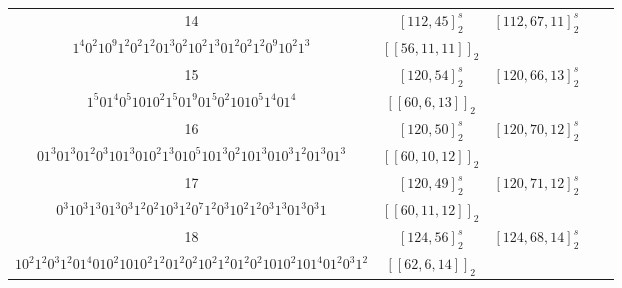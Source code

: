 \documentclass[journal]{IEEEtran}
\begin{document}
\begin{table}[!t]
\begin{tabular}{ccccc}
		14  & $[112, 45]_2^s$ & $[112, 67,11]_2^s$  &                                                                                                                                   \makecell[c]{$1^{2}0^{2}1^6,101010^{3}101^{2}0^{3}1^{4}0101^{2}0^{3}1^{3}0^{3}1^{2}0101^{4}0^{3}1^{2}010^{3}101$,\\$1^{4}0^{2}10^{9}1^{2}0^{2}1^{2}01^{3}0^{2}10^{2}1^{3}01^{2}0^{2}1^{2}0^{9}10^{2}1^3$}                                                                                                                                   & $[[56,11,11]]_2$ \\
		15  & $[120, 54]_2^s$ & $[120, 66,13]_2^s$  &                                                                                                                                         \makecell[c]{$1^{2}0^{2}1,0101010^{3}1^{5}01^{3}01^{2}0^{2}10^{3}1^{2}0^{3}1^{2}0^{3}10^{2}1^{2}01^{3}01^{5}0^{3}10101$,\\$1^{5}01^{4}0^{5}1010^{2}1^{5}01^{9}01^{5}0^{2}1010^{5}1^{4}01^4$}                                                                                                                                          & $[[60,6,13]]_2$  \\
		16  & $[120, 50]_2^s$ & $[120, 70,12]_2^s$  &                                                                                                                         \makecell[c]{$10^{5}101,0^{2}10^{3}10^{2}1^{2}01^{4}010^{4}1^{2}0^{2}1^{2}0^{5}1^{2}0^{2}1^{2}0^{4}101^{4}01^{2}0^{2}10^{3}1$,\\$01^{3}01^{3}01^{2}0^{3}101^{3}010^{2}1^{3}010^{5}101^{3}0^{2}101^{3}010^{3}1^{2}01^{3}01^3$}                                                                                                                         & $[[60,10,12]]_2$ \\
		17  & $[120, 49]_2^s$ & $[120, 71,12]_2^s$  &                                                                                                                           \makecell[c]{$10^{5}101,1^{2}010^{3}1^{4}0^{2}1010^{2}1010^{3}101^{3}0101^{3}010^{3}1010^{2}1010^{2}1^{4}0^{3}101$,\\$0^{3}10^{3}1^{3}01^{3}0^{3}1^{2}0^{2}10^{3}1^{2}0^{7}1^{2}0^{3}10^{2}1^{2}0^{3}1^{3}01^{3}0^{3}1$}                                                                                                                            & $[[60,11,12]]_2$ \\
		18  & $[124, 56]_2^s$ & $[124, 68,14]_2^s$  &                                                                                                                        \makecell[c]{$1^{4}01,1^{2}0^{2}101^{4}0^{7}1^{3}0^{4}10^{2}10^{3}10^{3}10^{2}10^{4}1^{3}0^{7}1^{4}010^{2}1$,\\$10^{2}1^{2}0^{3}1^{2}01^{4}010^{2}1010^{2}1^{2}01^{2}0^{2}10^{2}1^{2}01^{2}0^{2}1010^{2}101^{4}01^{2}0^{3}1^2$}                                                                                                                        & $[[62,6,14]]_2$  \\

\end{tabular}
\end{table}
\end{document}

